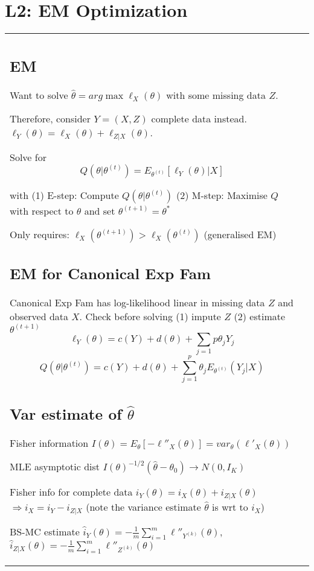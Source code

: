 \section{L2: EM Optimization}

\begin{tabulary}{\textwidth}{l L}

\subsection{EM}

Want to solve $ \hat\theta = arg \max \ell_X(\theta) $ with some missing data $Z$.

Therefore, consider $Y=(X, Z)$ complete data instead. $\ell_Y(\theta) =\ell_X(\theta) + \ell_{Z|X}(\theta)$.

Solve for $$Q(\theta|\theta^{(t)}) = E_{\theta^{(t)}}\left[\ell_Y(\theta)|X\right]$$

with (1) E-step: Compute $Q(\theta|\theta^{(t)})$ (2) M-step: Maximise  $Q$ with respect to $\theta$ and set $\theta^{(t+1)}=\theta^*$

Only requires: $\ell_X(\theta^{(t+1)}) > \ell_X(\theta^{(t)})$ (generalised EM)

\subsection{EM for Canonical Exp Fam}

Canonical Exp Fam has log-likelihood linear in missing data $Z$ and observed data $X$.
Check before solving (1) impute $Z$ (2) estimate $\theta^{(t+1)}$
$$
\ell_Y(\theta) = c(Y) + d(\theta) + \sum_{j=1}p \theta_j Y_j
$$
$$Q(\theta|\theta^{(t)}) = c(Y) + d(\theta) + \sum_{j=1}^p \theta_j E_{\theta^{(t)}}(Y_j|X)$$

\subsection{Var estimate of $\hat\theta$}

Fisher information $I(\theta) = E_\theta[-\ell''_X(\theta)] = var_\theta(\ell'_X (\theta))$

MLE asymptotic dist $I(\theta)^{-1/2}(\hat\theta-\theta_0) \rightarrow N(0, I_K)$

Fisher info for complete data $i_Y(\theta) = i_X(\theta) + i_{Z|X}(\theta)$ $\Rightarrow i_X = i_Y - i_{Z|X}$ (note the variance estimate $\hat\theta$ is wrt to $i_X$)

BS-MC estimate $\hat{i}_Y(\theta) = -\frac{1}{m}\sum_{i=1}^m \ell''_{Y^{(k)}}(\theta)$,
$\hat{i}_{Z|X}(\theta) = -\frac{1}{m}\sum_{i=1}^m \ell''_{Z^{(k)}}(\theta)$

\end{tabulary}

